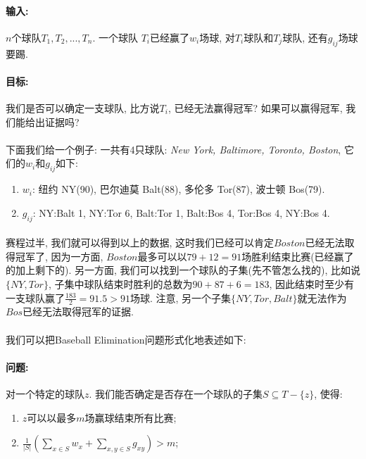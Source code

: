 \documentclass[a4paper]{article}
\begin{document}
        \paragraph{输入:}$n$个球队$T_1, T_2, ..., T_n$. 一个球队 $T_i$已经赢了$w_i$场球, 对$T_i$球队和$T_j$球队, 还有$g_{ij}$场球要踢.
        \paragraph{目标:}我们是否可以确定一支球队, 比方说$T_i$, 已经无法赢得冠军? 如果可以赢得冠军, 我们能给出证据吗?
        \paragraph{}下面我们给一个例子: 一共有4只球队: \textit{New York, Baltimore, Toronto, Boston}, 它们的$w_i$和$g_{ij}$如下:
        \begin{enumerate}
 \item $w_i$: 纽约 NY(90), 巴尔迪莫 Balt(88), 多伦多 Tor(87), 波士顿 Bos(79).
 \item $g_{ij}$: NY:Balt 1, NY:Tor 6, Balt:Tor 1, Balt:Bos 4, Tor:Bos 4, NY:Bos 4.
        \end{enumerate}
        \paragraph{}赛程过半, 我们就可以得到以上的数据, 这时我们已经可以肯定$Boston$已经无法取得冠军了, 因为一方面, $Boston$最多可以以$79+12=91$场胜利结束比赛(已经赢了的加上剩下的). 另一方面, 我们可以找到一个球队的子集(先不管怎么找的), 比如说$\{ NY, Tor \}$, 子集中球队结束时胜利的总数为$90+87+6 = 183$, 因此结束时至少有一支球队赢了$\frac{183}{2}=91.5 > 91$场球. 注意, 另一个子集$\{NY, Tor, Balt\}$就无法作为$Bos$已经无法取得冠军的证据.
        \paragraph{}我们可以把{\sc Baseball Elimination}问题形式化地表述如下:
        \paragraph{问题:} 对一个特定的球队$z$. 我们能否确定是否存在一个球队的子集$S \subseteq T-\{z\}$, 使得:
        \begin{enumerate}
 \item $z$可以以最多$m$场赢球结束所有比赛;
 \item $\frac{1}{|S|} ( \sum\nolimits_{x\in S} w_x + \sum\nolimits_{x,y\in S} g_{xy} )> m $;
        \end{enumerate}
\end{document}
